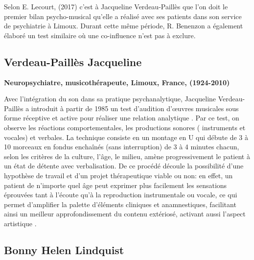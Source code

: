        Selon E. Lecourt,
(2017)\autocite[ch.~3, p.~84]{lecourt_les_2017}
c'est à Jacqueline Verdeau-Paillès que l'on doit le premier bilan
psycho-musical qu'elle a réalisé avec ses patients dans son service
de psychiatrie à Limoux. Durant cette même période, R.
Benenzon a également élaboré un test similaire
\autocite{benenzon:musicotherapie} où une co-influence n'est pas à exclure.





\subsection{Verdeau-Paillès Jacqueline
}
\textbf{Neuropsychiatre,
  musicothérapeute, Limoux, France, (1924-2010)}

Avec l'intégration du son dans sa pratique psychanalytique,
Jacqueline Verdeau-Paillès a introduit  à partir de 1985  un test d'audition d'\oe uvres musicales
sous forme réceptive et active pour réaliser
une relation analytique \autocite{verdeau-pailles:bilan}.
Par ce test, on
observe les réactions comportementales, les productions sonores (
instruments et vocales) et verbales. La technique consiste en un montage en U qui débute de 3 à 10
morceaux en fondus enchaînés (sans interruption) de 3 à 4 minutes chacun, selon les
critères de la culture, l'âge, le milieu,
amène progressivement le patient à un état de détente
avec verbalisation. De ce procédé découle la possibilité
d'une hypothèse de
travail et d'un projet thérapeutique viable ou non:
en effet, un patient de n'importe quel âge peut exprimer plus facilement les
sensations éprouvées tant à l'écoute qu'à la reproduction
instrumentale ou vocale, ce qui permet d'amplifier la palette d'éléments
cliniques et anamnestiques, facilitant ainsi un meilleur approfondissement du
contenu extériosé, activant aussi l'aspect artistique
\autocite{verdeau_expression}.



\subsection{Bonny Helen Lindquist}

